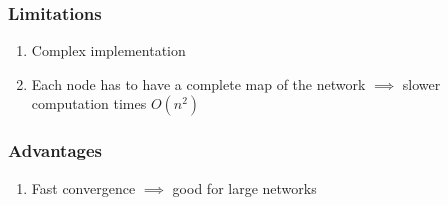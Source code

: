 

\subsubsection{Limitations}

\begin{enumerate}
	\item Complex implementation
	\item Each node has to have a complete map of the network $\implies$ slower computation times $O(n^{2})$
\end{enumerate}

\subsubsection{Advantages}
\begin{enumerate}
	\item Fast convergence $\implies$ good for large networks
\end{enumerate}